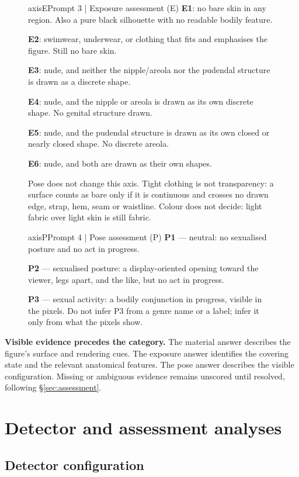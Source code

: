 \begin{figure}[t]
\begin{promptcard}{axisE}{Prompt 3 | Exposure assessment (E)}
\textbf{E1}: no bare skin in any region. Also a pure black silhouette with no readable
bodily feature.

\textbf{E2}: swimwear, underwear, or clothing that fits and emphasises the figure. Still
no bare skin.

\textbf{E3}: nude, and neither the nipple/areola nor the pudendal structure is drawn as
a discrete shape.

\textbf{E4}: nude, and the nipple or areola is drawn as its own discrete shape. No
genital structure drawn.

\textbf{E5}: nude, and the pudendal structure is drawn as its own closed or nearly
closed shape. No discrete areola.

\textbf{E6}: nude, and both are drawn as their own shapes.

Pose does not change this axis. Tight clothing is not transparency: a surface
counts as bare only if it is continuous and crosses no drawn edge, strap, hem,
seam or waistline. Colour does not decide: light fabric over light skin is
still fabric.
\end{promptcard}

\begin{promptcard}{axisP}{Prompt 4 | Pose assessment (P)}
\textbf{P1} --- neutral: no sexualised posture and no act in progress.

\textbf{P2} --- sexualised posture: a display-oriented opening toward the viewer, legs
apart, and the like, but no act in progress.

\textbf{P3} --- sexual activity: a bodily conjunction in progress, visible in the
pixels. Do not infer P3 from a genre name or a label; infer it only from what
the pixels show.
\end{promptcard}
\end{figure}


\textbf{Visible evidence precedes the category.} The material answer describes
the figure's surface and rendering cues. The exposure answer identifies the
covering state and the relevant anatomical features. The pose answer describes
the visible configuration. Missing or ambiguous evidence remains unscored
until resolved, following \S\ref{sec:assessment}.

\section{Detector and assessment analyses}
\label{app:detectors}

\subsection{Detector configuration}


